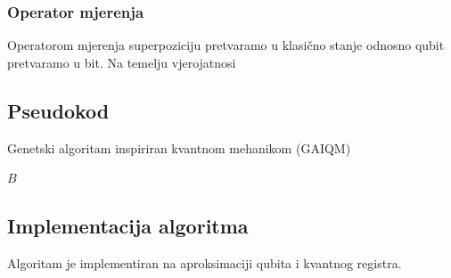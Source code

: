 \documentclass[times, utf8, zavrsni, numeric]{fer}
\begin{document}
\subsubsection{Operator mjerenja}
Operatorom mjerenja superpoziciju pretvaramo u klasično stanje odnosno qubit pretvaramo u bit. Na temelju vjerojatnosi 

\newpage

\subsection{Pseudokod}
\begin{algorithm}
\caption{Genetski algoritam inspiriran kvantnom mehanikom (GAIQM)}
\label{algo:gaiqm}
\begin{algorithmic}
\ENDIF
{}
\ENDWHILE
\RETURN $B$
\end{algorithmic}
\end{algorithm}

\newpage

\subsection{Implementacija algoritma}
Algoritam je implementiran na aproksimaciji qubita i kvantnog registra.
\end{document}
